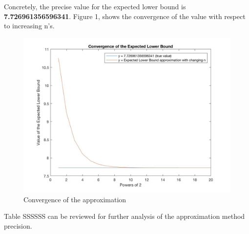 \documentclass[10pt,oneside,a4paper]{article}
\begin{document}
\begin{flushleft}
Concretely, the precise value for the expected lower bound is \textbf{7.726961356596341}. Figure 1, shows the convergence of the value with respect to increasing n's.  
\begin{figure}[H]
\centering
        \includegraphics[totalheight=8cm]{convergence.jpg}
        \caption{Convergence of the approximation}
\end{figure}

Table SSSSSS can be reviewed for further analysis of the approximation method precision.


\end{flushleft}
\end{document}
